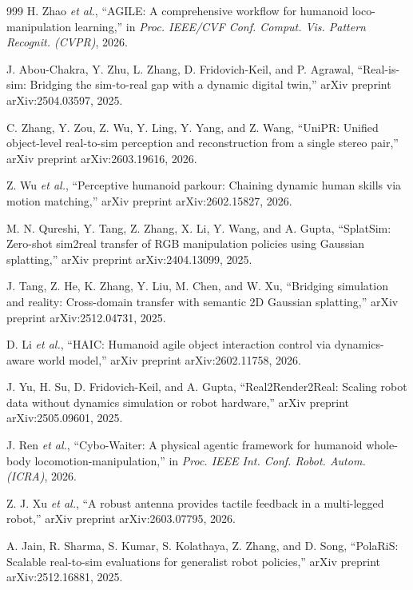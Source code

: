 \documentclass[12pt,a4paper,oneside]{report}
\begin{document}
\begin{thebibliography}{999}
H. Zhao \textit{et al.}, ``{AGILE}: A comprehensive workflow for humanoid loco-manipulation learning,'' in \textit{Proc. IEEE/CVF Conf. Comput. Vis. Pattern Recognit. (CVPR)}, 2026.

J. Abou-Chakra, Y. Zhu, L. Zhang, D. Fridovich-Keil, and P. Agrawal, ``Real-is-sim: Bridging the sim-to-real gap with a dynamic digital twin,'' arXiv preprint arXiv:2504.03597, 2025.

C. Zhang, Y. Zou, Z. Wu, Y. Ling, Y. Yang, and Z. Wang, ``{UniPR}: Unified object-level real-to-sim perception and reconstruction from a single stereo pair,'' arXiv preprint arXiv:2603.19616, 2026.

Z. Wu \textit{et al.}, ``Perceptive humanoid parkour: Chaining dynamic human skills via motion matching,'' arXiv preprint arXiv:2602.15827, 2026.

M. N. Qureshi, Y. Tang, Z. Zhang, X. Li, Y. Wang, and A. Gupta, ``{SplatSim}: Zero-shot sim2real transfer of {RGB} manipulation policies using Gaussian splatting,'' arXiv preprint arXiv:2404.13099, 2025.

J. Tang, Z. He, K. Zhang, Y. Liu, M. Chen, and W. Xu, ``Bridging simulation and reality: Cross-domain transfer with semantic 2D Gaussian splatting,'' arXiv preprint arXiv:2512.04731, 2025.

D. Li \textit{et al.}, ``{HAIC}: Humanoid agile object interaction control via dynamics-aware world model,'' arXiv preprint arXiv:2602.11758, 2026.

J. Yu, H. Su, D. Fridovich-Keil, and A. Gupta, ``{Real2Render2Real}: Scaling robot data without dynamics simulation or robot hardware,'' arXiv preprint arXiv:2505.09601, 2025.

J. Ren \textit{et al.}, ``Cybo-Waiter: A physical agentic framework for humanoid whole-body locomotion-manipulation,'' in \textit{Proc. IEEE Int. Conf. Robot. Autom. (ICRA)}, 2026.

Z. J. Xu \textit{et al.}, ``A robust antenna provides tactile feedback in a multi-legged robot,'' arXiv preprint arXiv:2603.07795, 2026.

A. Jain, R. Sharma, S. Kumar, S. Kolathaya, Z. Zhang, and D. Song, ``{PolaRiS}: Scalable real-to-sim evaluations for generalist robot policies,'' arXiv preprint arXiv:2512.16881, 2025.


\end{thebibliography}
\end{document}
